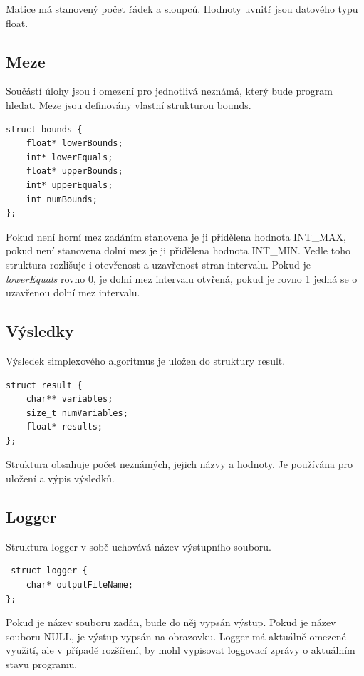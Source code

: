 \documentclass[
12pt,
a4paper,
pdftex,
czech,
titlepage
]{report}
\begin{document}
\begin{itemize}[label={}]
Matice má stanovený počet řádek a sloupců. Hodnoty uvnitř jsou datového typu float.  


\subsection{Meze}

Součástí úlohy jsou i omezení pro jednotlivá neznámá, který bude program hledat. Meze jsou definovány vlastní strukturou bounds.

\begin{verbatim}
struct bounds {
    float* lowerBounds;
    int* lowerEquals;
    float* upperBounds; 
    int* upperEquals; 
    int numBounds;
};
\end{verbatim}

Pokud není horní mez zadáním stanovena je ji přidělena hodnota INT\_MAX, pokud není stanovena dolní mez je ji přidělena hodnota INT\_MIN.
Vedle toho struktura rozlišuje i otevřenost a uzavřenost stran intervalu. Pokud je \textit{lowerEquals} rovno 0, je dolní mez intervalu otvřená, pokud je rovno 1 jedná se o uzavřenou dolní mez intervalu.

\subsection{Výsledky}

Výsledek simplexového algoritmus je uložen do struktury result.

\begin{verbatim}
struct result {
    char** variables; 
    size_t numVariables; 
    float* results; 
};
\end{verbatim}

Struktura obsahuje počet neznámých, jejich názvy a hodnoty. Je používána pro uložení a výpis výsledků.

\subsection{Logger}

Struktura logger v sobě uchovává název výstupního souboru.

\begin{verbatim}
 struct logger {
    char* outputFileName;
};
\end{verbatim}

Pokud je název souboru zadán, bude do něj vypsán výstup. Pokud je název souboru NULL, je výstup vypsán na obrazovku. Logger má aktuálně omezené využití, ale v případě rozšíření, by mohl vypisovat loggovací zprávy o aktuálním stavu programu.


\end{itemize}
\end{document}
